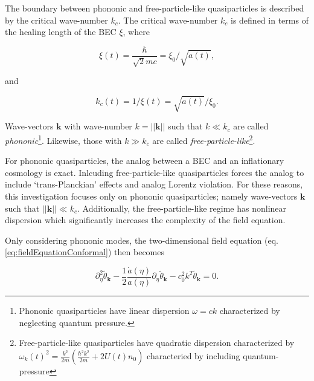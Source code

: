 \documentclass{article}
\begin{document}
            The boundary between phononic and free-particle-like quasiparticles is described by the critical wave-number $k_c$.  The critical wave-number $k_c$ is defined\cite{Jain} in terms of the healing length of the BEC $\xi$, where

            \begin{equation} \label{eq:healing}
                \xi(t) = \frac{\hbar}{\sqrt{2} m c} = \xi_0 / \sqrt{a(t)},
            \end{equation}

            and

            \begin{equation} \label{eq:critical}
                k_c(t) = 1 / \xi(t) = \sqrt{a(t)} / \xi_0.
            \end{equation}

            Wave-vectors $\mathbf{k}$ with wave-number $k = ||\mathbf{k}||$ such that $k \ll k_c$ are called \emph{phononic}\footnote{Phononic quasiparticles have linear dispersion $\omega = c k$ characterized by neglecting quantum pressure.}.  Likewise, those with $k \gg k_c$ are called \emph{free-particle-like}\footnote{Free-particle-like quasiparticles have quadratic dispersion characterized by $\omega_k(t)^2 = \frac{k^2}{2m} \left(\frac{\hbar^2 k^2}{2m} + 2 U(t) n_0\right)$ characteried by including quantum-pressure}.

            For phononic quasiparticles, the analog between a BEC and an inflationary cosmology is exact.  Inlcuding free-particle-like quasiparticles forces the analog to include `trans-Planckian' effects and analog Lorentz violation\cite{Jain}.  For these reasons, this investigation focuses only on phononic quasiparticles; namely wave-vectors $\mathbf{k}$ such that $||\mathbf{k}|| \ll k_c$.  Additionally, the free-particle-like regime has nonlinear dispersion which significantly increases the complexity of the field equation\cite{Jain}.

            Only considering phononic modes, the two-dimensional field equation (eq. \ref{eq:fieldEquationConformal}) then becomes

            \begin{equation} \label{eq:fieldEquationConformalFourier}
                \boxed{\partial_\eta^2 \widetilde{\theta}_\mathbf{k} - \frac{1}{2} \frac{\dot{a}(\eta)}{a(\eta)} \partial_\eta \widetilde{\theta}_\mathbf{k} - c_0^2 k^2 \widetilde{\theta}_\mathbf{k} = 0.}
            \end{equation}
\end{document}
